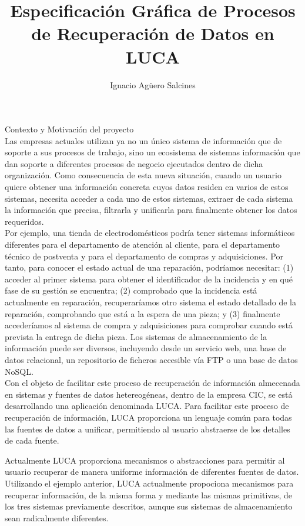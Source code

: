\documentclass[a4paper,12pt]{article}
\title{Especificación Gráfica de Procesos de Recuperación de Datos en LUCA
}
\author{Ignacio Agüero Salcines}
\begin{document}
	
	\maketitle
	
	\newpage

	{\Large Contexto y  Motivación del proyecto}\\

	Las empresas actuales utilizan ya no un único sistema de información que de
	soporte a sus procesos de trabajo, sino un  ecosistema de sistemas información
	que dan soporte a diferentes procesos de negocio ejecutados dentro de dicha
	organización. Como consecuencia de esta nueva situación, cuando un usuario
	quiere obtener una información concreta cuyos datos residen en varios de estos
	sistemas, necesita acceder a cada uno de estos sistemas, extraer de cada
	sistema la información que precisa, filtrarla y unificarla para finalmente
	obtener los datos requeridos.\\
	
	Por ejemplo, una tienda de electrodomésticos podría tener sistemas informáticos
	diferentes para el departamento de atención al cliente, para el departamento
	técnico de postventa y para el departamento de compras y adquisiciones.
	Por tanto, para conocer el estado actual de una reparación, podríamos necesitar:
	(1) acceder al primer sistema para obtener el identificador de la incidencia y
	en qué fase de su gestión se encuentra; (2) comprobado que la incidencia está
	actualmente en reparación, recuperaríamos otro sistema el estado detallado de
	la reparación, comprobando que está a la espera de una pieza; y (3) finalmente
	accederíamos al sistema de compra y adquisiciones para comprobar cuando está
	prevista la entrega de dicha pieza. Los sistemas de almacenamiento de la
	información puede ser diversos, incluyendo desde un servicio web, una base de
	datos relacional, un repositorio de ficheros accesible vía FTP o una base de
	datos NoSQL.\\
 
	
	Con el objeto de facilitar este proceso de recuperación de información
	almecenada en sistemas y fuentes de datos hetereogéneas, dentro de la empresa
	CIC, se está desarrollando una aplicación denominada LUCA. Para
	facilitar este proceso de recuperación de información, LUCA proporciona un
	lenguaje común para todas las fuentes de datos a unificar, permitiendo al
	usuario abstraerse de los detalles de cada fuente.
	
	Actualmente LUCA proporciona mecanismos o abstracciones para permitir al
	usuario recuperar de manera uniforme información de diferentes fuentes de datos.
	Utilizando el ejemplo anterior, LUCA actualmente propociona mecanismos para
	recuperar información, de la misma forma y mediante las mismas primitivas, de
	los tres sistemas previamente descritos, aunque sus sistemas de almacenamiento
	sean radicalmente diferentes.
	
\end{document}
